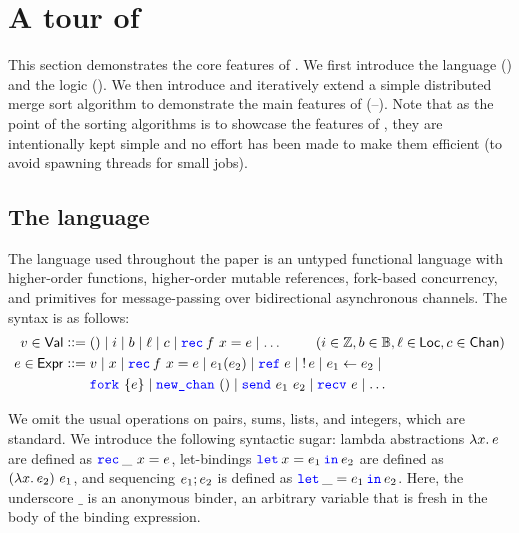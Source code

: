 \section{A tour of \lname}
\label{sec:tour}

This section demonstrates the core features of \lname.
We first introduce the language () and the logic
().
We then introduce and iteratively extend a simple distributed merge sort algorithm to
demonstrate the main features of \lname (--).
Note that as the point of the sorting algorithms is to showcase the features
of \lname, they are intentionally kept simple and no effort has been made
to make them efficient (\eg to avoid spawning threads for small jobs).

\subsection{The \lname language}
\label{sec:language}

The language used throughout the paper is an untyped functional language with
higher-order functions, higher-order mutable references, fork-based
concurrency, and primitives for message-passing over bidirectional asynchronous
channels.
The syntax is as follows:
%
\begin{align*}
\val \in \Val \bnfdef{}&
  \TT \mid
  i \mid
  b \mid
  \loc \mid
  \chan \mid
  \Rec f x = \expr \mid \ldots &
  \hspace{-6em} (i \in \integer, b \in \bool, \loc \in \Loc, \chan \in \Chan) \\
\expr \in \Expr \bnfdef{}&
  \val \mid
  \var \mid
  \Rec f x = \expr \mid
  \expr_1(\expr_2) \mid
  \newref\expr \mid
  \deref \expr \mid
  \expr_1 \gets \expr_2 \mid \\ &
  \Fork \expr \mid
  \newchan \mid \send{\expr_1}{\expr_2} \mid \recv{\expr} \mid \ldots
\end{align*}

\noindent
We omit the usual operations on pairs, sums, lists, and integers, which are standard.
We introduce the following syntactic sugar:
lambda abstractions $\Lam \var. \expr$ are defined as $\Rec \_ \var = \expr$,
let-bindings $\Let \var = \expr_1 in \expr_2$ are defined as $(\Lam \var. \expr_2)\ \expr_1$,
and sequencing $e_1 ; e_2$ is defined as $\Let \_ = \expr_1 in \expr_2$.
Here, the underscore $\_$ is an anonymous binder, \ie an arbitrary variable
that is fresh in the body of the binding expression.

